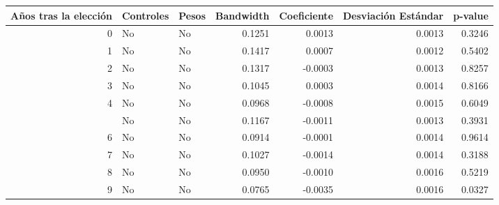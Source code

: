 
\begin{tabular}{rllrrrr}
\toprule
Años tras la elección & Controles & Pesos & Bandwidth & Coeficiente & Desviación Estándar & p-value\\
\midrule
0 & No & No & 0.1251 & 0.0013 & 0.0013 & 0.3246\\
1 & No & No & 0.1417 & 0.0007 & 0.0012 & 0.5402\\
2 & No & No & 0.1317 & -0.0003 & 0.0013 & 0.8257\\
3 & No & No & 0.1045 & 0.0003 & 0.0014 & 0.8166\\
4 & No & No & 0.0968 & -0.0008 & 0.0015 & 0.6049\\
\addlinespace
5 & No & No & 0.1167 & -0.0011 & 0.0013 & 0.3931\\
6 & No & No & 0.0914 & -0.0001 & 0.0014 & 0.9614\\
7 & No & No & 0.1027 & -0.0014 & 0.0014 & 0.3188\\
8 & No & No & 0.0950 & -0.0010 & 0.0016 & 0.5219\\
9 & No & No & 0.0765 & -0.0035 & 0.0016 & 0.0327\\
\bottomrule
\end{tabular}
